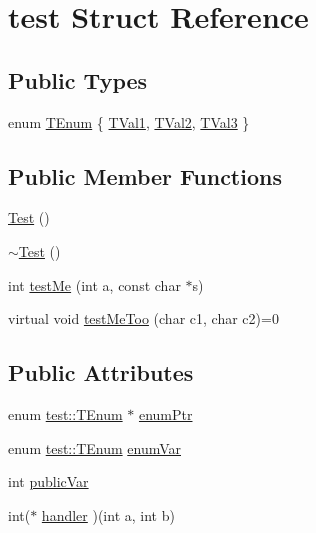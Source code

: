 \hypertarget{structtest}{\section{test Struct Reference}
\label{structtest}
}
\subsection*{Public Types}
\begin{DoxyCompactItemize}
\item 
enum \hyperlink{structtest_aa4656e760fafc71e3baa18e8e579e3f0}{T\-Enum} \{ \hyperlink{structtest_aa4656e760fafc71e3baa18e8e579e3f0a4dedb3065371348c69688cccbb22340b}{T\-Val1}, 
\hyperlink{structtest_aa4656e760fafc71e3baa18e8e579e3f0abc840bd9a6997f189c4132df2bbdb79b}{T\-Val2}, 
\hyperlink{structtest_aa4656e760fafc71e3baa18e8e579e3f0a43767eca7b82bce370ca3eeea1761efb}{T\-Val3}
 \}
\end{DoxyCompactItemize}
\subsection*{Public Member Functions}
\begin{DoxyCompactItemize}
\item 
\hyperlink{structtest_a6accd2baa709b4d23bf5a46f5cb4f2f8}{Test} ()
\item 
\hyperlink{structtest_a67c874d1f53bdcac775f81aee33d46f1}{$\sim$\-Test} ()
\item 
int \hyperlink{structtest_a327710fadd5e4f9a81c27151db774166}{test\-Me} (int a, const char $\ast$s)
\item 
virtual void \hyperlink{structtest_afdede55e4f5e571f186113a047b29922}{test\-Me\-Too} (char c1, char c2)=0
\end{DoxyCompactItemize}
\subsection*{Public Attributes}
\begin{DoxyCompactItemize}
\item 
enum \hyperlink{structtest_aa4656e760fafc71e3baa18e8e579e3f0}{test\-::\-T\-Enum} $\ast$ \hyperlink{structtest_acdaa5472c4df0e16372e50f459a9373d}{enum\-Ptr}
\item 
enum \hyperlink{structtest_aa4656e760fafc71e3baa18e8e579e3f0}{test\-::\-T\-Enum} \hyperlink{structtest_aa14105cde7beb48b81ad15d1acc827a6}{enum\-Var}
\item 
int \hyperlink{structtest_a8ec0a84242379c5ac349646057e13d20}{public\-Var}
\item 
int($\ast$ \hyperlink{structtest_a6dad6fe8d3d6a694ec4d2789843e22b3}{handler} )(int a, int b)
\end{DoxyCompactItemize}


